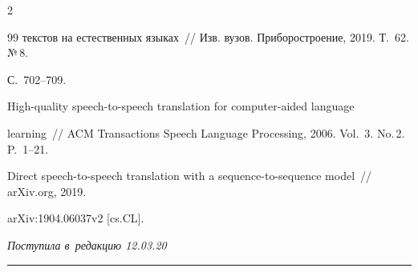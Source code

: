 \begin{multicols}{2}
{{\begin{thebibliography}{99}
текстов на естественных языках~// Изв. вузов. Приборостроение, 2019. Т.~62. №\,8.  


С.~702--709.




 High-quality speech-to-speech translation for computer-aided language 


learning~// ACM Transactions Speech Language Processing, 2006. Vol.~3. No.\,2. P.~1--21.






Direct speech-to-speech translation with a sequence-to-sequence model~// arXiv.org, 2019. 


arXiv:\linebreak 1904.06037v2 [cs.CL].


\end{thebibliography}





 }


 }





\end{multicols}





\vspace*{-9pt}





\hfill{\small\textit{Поступила в~редакцию 12.03.20}}





\vspace*{6pt}




















\hrule






